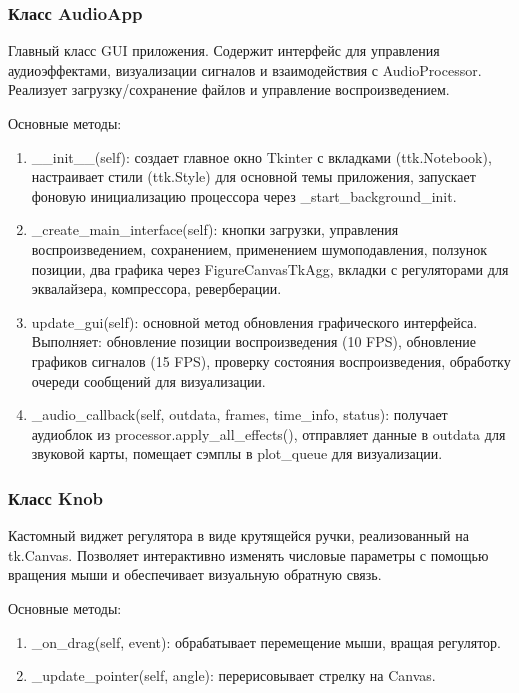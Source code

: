 \subsubsection{Класс AudioApp}

Главный класс GUI приложения. Содержит интерфейс для управления аудиоэффектами, визуализации сигналов и взаимодействия с AudioProcessor. Реализует загрузку/сохранение файлов и управление воспроизведением.

Основные методы:
\begin{enumerate}
	\item \_\_init\_\_(self): создает главное окно Tkinter с вкладками (ttk.Notebook), настраивает стили (ttk.Style) для основной темы приложения, запускает фоновую инициализацию процессора через \_start\_background\_init.
	\item \_create\_main\_interface(self): кнопки загрузки, управления воспроизведением, сохранением, применением шумоподавления, ползунок позиции, два графика через FigureCanvasTkAgg, вкладки с регуляторами для эквалайзера, компрессора, реверберации.
	\item update\_gui(self): основной метод обновления графического интерфейса. Выполняет: обновление позиции воспроизведения (10 FPS), обновление графиков сигналов (15 FPS), проверку состояния воспроизведения, обработку очереди сообщений для визуализации.
	\item \_audio\_callback(self, outdata, frames, time\_info, status): получает аудиоблок из processor.apply\_all\_effects(), отправляет данные в outdata для звуковой карты, помещает сэмплы в plot\_queue для визуализации.
\end{enumerate}

\subsubsection{Класс Knob}

Кастомный виджет регулятора в виде крутящейся ручки, реализованный на tk.Canvas. Позволяет интерактивно изменять числовые параметры с помощью вращения мыши и обеспечивает визуальную обратную связь.

Основные методы:
\begin{enumerate}
	\item \_on\_drag(self, event): обрабатывает перемещение мыши, вращая регулятор.
	\item \_update\_pointer(self, angle): перерисовывает стрелку на Canvas.
\end{enumerate}


